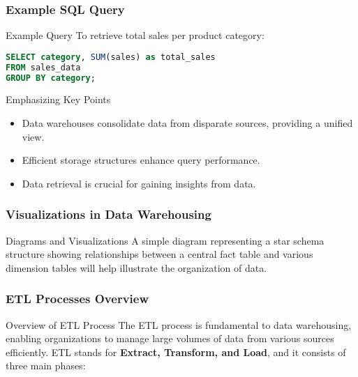 \documentclass{beamer}
\begin{document}
\begin{frame}[fragile]
    \frametitle{Example SQL Query}

    \begin{block}{Example Query}
        To retrieve total sales per product category:
        \begin{lstlisting}[language=SQL]
SELECT category, SUM(sales) as total_sales
FROM sales_data
GROUP BY category;
        \end{lstlisting}
    \end{block}

    \begin{block}{Emphasizing Key Points}
        \begin{itemize}
            \item Data warehouses consolidate data from disparate sources, providing a unified view.
            \item Efficient storage structures enhance query performance.
            \item Data retrieval is crucial for gaining insights from data.
        \end{itemize}
    \end{block}
\end{frame}

\begin{frame}[fragile]
    \frametitle{Visualizations in Data Warehousing}

    \begin{block}{Diagrams and Visualizations}
        A simple diagram representing a star schema structure showing relationships between a central fact table and various dimension tables will help illustrate the organization of data.
    \end{block}
\end{frame}

\begin{frame}[fragile]
    \frametitle{ETL Processes Overview}
    \begin{block}{Overview of ETL Process}
        The ETL process is fundamental to data warehousing, enabling organizations to manage large volumes of data from various sources efficiently. 
        ETL stands for \textbf{Extract, Transform, and Load}, and it consists of three main phases:
    \end{block}
\end{frame}
\end{document}
